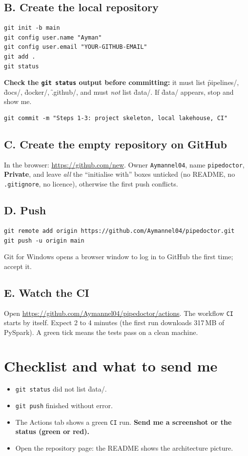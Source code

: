 \documentclass[11pt,a4paper]{article}
\let\oldsection\section
\renewcommand{\section}{\Needspace*{9\baselineskip}\oldsection}
\begin{document}
\subsection*{B. Create the local repository}
\begin{lstlisting}[style=cmd]
git init -b main
git config user.name "Ayman"
git config user.email "YOUR-GITHUB-EMAIL"
git add .
git status
\end{lstlisting}
\textbf{Check the \texttt{git status} output before committing:} it must list \f{pipelines/}, \f{docs/}, \f{docker/}, \f{.github/}, and must \emph{not} list \f{data/}. If \f{data/} appears, stop and show me.
\begin{lstlisting}[style=cmd]
git commit -m "Steps 1-3: project skeleton, local lakehouse, CI"
\end{lstlisting}

\subsection*{C. Create the empty repository on GitHub}
In the browser: \url{https://github.com/new}. Owner \texttt{Aymannel04}, name \texttt{pipedoctor}, \textbf{Private}, and leave \emph{all} the ``initialise with'' boxes unticked (no README, no \texttt{.gitignore}, no licence), otherwise the first push conflicts.

\subsection*{D. Push}
\begin{lstlisting}[style=cmd]
git remote add origin https://github.com/Aymannel04/pipedoctor.git
git push -u origin main
\end{lstlisting}
Git for Windows opens a browser window to log in to GitHub the first time; accept it.

\subsection*{E. Watch the CI}
Open \url{https://github.com/Aymannel04/pipedoctor/actions}. The workflow \texttt{CI} starts by itself. Expect 2 to 4 minutes (the first run downloads 317\,MB of PySpark). A green tick means the tests pass on a clean machine.

\section{Checklist and what to send me}
\begin{itemize}[leftmargin=14pt,itemsep=2pt]
\item[\fbox{\phantom{x}}] \texttt{git status} did not list \f{data/}.
\item[\fbox{\phantom{x}}] \texttt{git push} finished without error.
\item[\fbox{\phantom{x}}] The Actions tab shows a green \texttt{CI} run. \textbf{Send me a screenshot or the status (green or red).}
\item[\fbox{\phantom{x}}] Open the repository page: the README shows the architecture picture.
\end{itemize}
\end{document}
